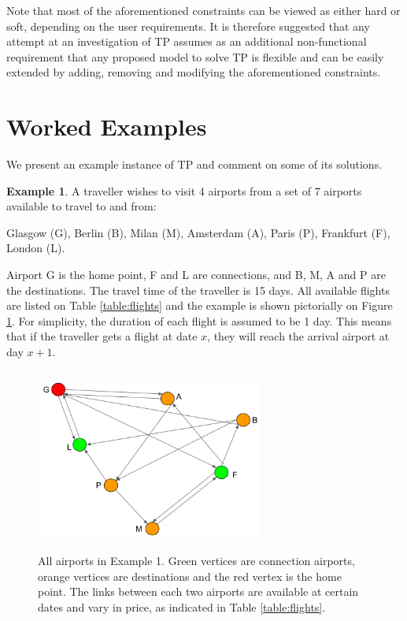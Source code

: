 \documentclass{mprop}
\theoremstyle{definition}
\newtheorem{example}{Example}
\begin{document}
Note that most of the aforementioned constraints can be viewed as either hard or soft, depending on the user requirements. It is therefore suggested that any attempt at an investigation of TP assumes as an additional non-functional requirement that any proposed model to solve TP is flexible and can be easily extended by adding, removing and modifying the aforementioned constraints.

\section{Worked Examples}
\label{sec:tpexample}
We present an example instance of TP and comment on some of its solutions.

\begin{example}
\label{example1}
A traveller wishes to visit 4 airports from a set of 7 airports available to travel to and from: 

Glasgow (G), Berlin (B), Milan (M), Amsterdam (A), Paris (P), Frankfurt (F), London (L).

Airport G is the home point, F and L are connections, and B, M, A and P are the destinations. The travel time of the traveller is 15 days. All available flights are listed on Table \ref{table:flights} and the example is shown pictorially on Figure \ref{fig:map}. For simplicity, the duration of each flight is assumed to be 1 day. This means that if the traveller gets a flight at date $x$, they will reach the arrival airport at day $x+1$.

\begin{figure}
\centering
\includegraphics[height=6cm, width=7.5cm]{images/map.png}
\caption{All airports in Example 1. Green vertices are connection airports, orange vertices are destinations and the red vertex is the home point. The links between each two airports are available at certain dates and vary in price, as indicated in Table \ref{table:flights}.}
\label{fig:map}
\end{figure}


\end{example}
\end{document}

